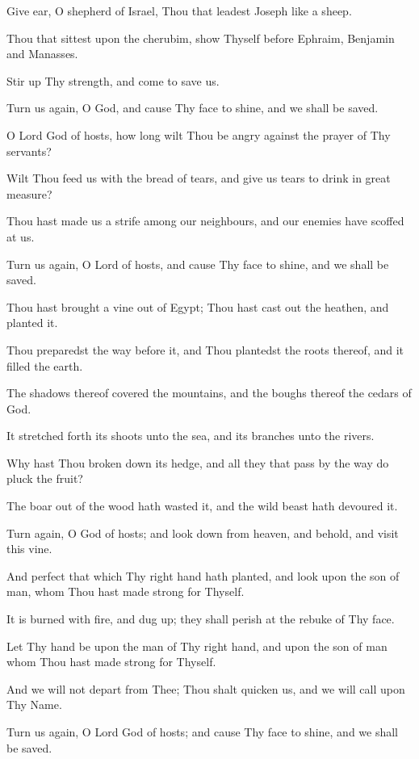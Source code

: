 Give ear, O shepherd of Israel, Thou that leadest Joseph like a sheep.

Thou that sittest upon the cherubim, show Thyself before Ephraim, Benjamin and Manasses.

Stir up Thy strength, and come to save us.

Turn us again, O God, and cause Thy face to shine, and we shall be saved.

O Lord God of hosts, how long wilt Thou be angry against the prayer of Thy servants?

Wilt Thou feed us with the bread of tears, and give us tears to drink in great measure?

Thou hast made us a strife among our neighbours, and our enemies have scoffed at us.

Turn us again, O Lord of hosts, and cause Thy face to shine, and we shall be saved.

Thou hast brought a vine out of Egypt; Thou hast cast out the heathen, and planted it.

Thou preparedst the way before it, and Thou plantedst the roots thereof, and it filled the earth.

The shadows thereof covered the mountains, and the boughs thereof the cedars of God.

It stretched forth its shoots unto the sea, and its branches unto the rivers.

Why hast Thou broken down its hedge, and all they that pass by the way do pluck the fruit?

The boar out of the wood hath wasted it, and the wild beast hath devoured it.

Turn again, O God of hosts; and look down from heaven, and behold, and visit this vine.

And perfect that which Thy right hand hath planted, and look upon the son of man, whom Thou hast made strong for Thyself.

It is burned with fire, and dug up; they shall perish at the rebuke of Thy face.

Let Thy hand be upon the man of Thy right hand, and upon the son of man whom Thou hast made strong for Thyself.

And we will not depart from Thee; Thou shalt quicken us, and we will call upon Thy Name.

Turn us again, O Lord God of hosts; and cause Thy face to shine, and we shall be saved.
